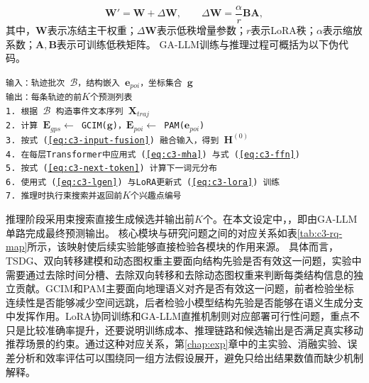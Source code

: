 \begin{equation}
\mathbf{W}'=\mathbf{W}+\Delta\mathbf{W},\qquad \Delta\mathbf{W}=\frac{\alpha}{r}\mathbf{B}\mathbf{A},
\label{eq:c3-lora}
\end{equation}
其中，$\mathbf{W}$表示冻结主干权重；$\Delta\mathbf{W}$表示低秩增量参数；$r$表示LoRA秩；$\alpha$表示缩放系数；$\mathbf{A},\mathbf{B}$表示可训练低秩矩阵。
GA-LLM训练与推理过程可概括为以下伪代码。\begin{tcolorbox}[
  breakable,
  colback=PromptBg,
  colframe=PromptBorder,
  boxrule=0.6pt,
  arc=2pt,
  left=8pt,right=8pt,top=6pt,bottom=6pt,
  title={算法3-1  GA-LLM分支及GCIM/PAM注入流程}
]
\texttt{输入：轨迹批次 $\mathcal{B}$，结构嵌入 $\mathbf{e}_{poi}$，坐标集合 $\mathbf{g}$}\\
\texttt{输出：每条轨迹的前$K$个预测列表}\\
\texttt{1. 根据 $\mathcal{B}$ 构造事件文本序列 $\mathbf{X}_{traj}$}\\
\texttt{2. 计算 $\mathbf{E}_{gps}\leftarrow$ GCIM($\mathbf{g}$)，$\mathbf{E}_{poi}\leftarrow$ PAM($\mathbf{e}_{poi}$)}\\
\texttt{3. 按式~(\ref{eq:c3-input-fusion}) 融合输入，得到 $\mathbf{H}^{(0)}$}\\
\texttt{4. 在每层Transformer中应用式~(\ref{eq:c3-mha}) 与式~(\ref{eq:c3-ffn})}\\
\texttt{5. 按式~(\ref{eq:c3-next-token}) 计算下一词元分布}\\
\texttt{6. 使用式~(\ref{eq:c3-lgen}) 与LoRA更新式~(\ref{eq:c3-lora}) 训练}\\
\texttt{7. 推理时执行束搜索并返回前$K$个兴趣点编号}
\end{tcolorbox}
推理阶段采用束搜索直接生成候选并输出前$K$个。在本文设定中，，即由GA-LLM单路完成最终预测输出。
核心模块与研究问题之间的对应关系如表\ref{tab:c3-rq-map}所示，该映射使后续实验能够直接检验各模块的作用来源。
具体而言，TSDG、双向转移建模和动态图权重主要面向结构先验是否有效这一问题，实验中需要通过去除时间分槽、去除双向转移和去除动态图权重来判断每类结构信息的独立贡献。GCIM和PAM主要面向地理语义对齐是否有效这一问题，前者检验坐标连续性是否能够减少空间远跳，后者检验小模型结构先验是否能够在语义生成分支中发挥作用。LoRA协同训练和GA-LLM直推机制则对应部署可行性问题，重点不只是比较准确率提升，还要说明训练成本、推理链路和候选输出是否满足真实移动推荐场景的约束。通过这种对应关系，第\ref{chap:exp}章中的主实验、消融实验、误差分析和效率评估可以围绕同一组方法假设展开，避免只给出结果数值而缺少机制解释。

